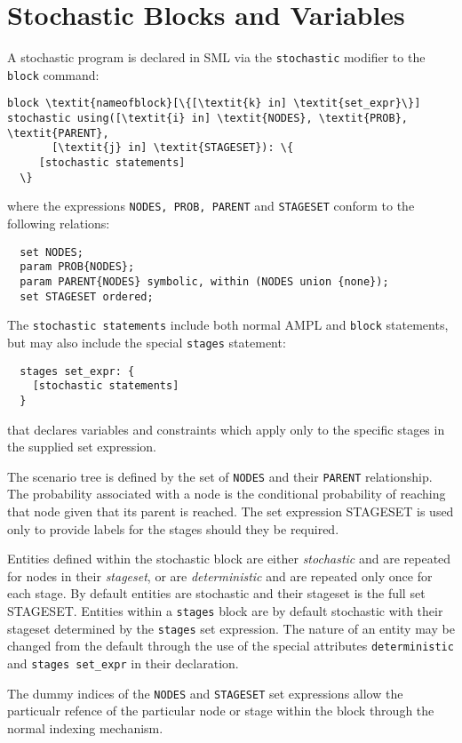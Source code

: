 \documentclass[10pt,a4paper]{report}
\begin{document}
\section{Stochastic Blocks and Variables}
A stochastic program is declared in SML via the {\tt stochastic} modifier
to the {\tt block} command:
\begin{Verbatim}[commandchars=\\\{\}]
  block \textit{nameofblock}[\{[\textit{k} in] \textit{set_expr}\}] stochastic using([\textit{i} in] \textit{NODES}, \textit{PROB}, \textit{PARENT}, 
       [\textit{j} in] \textit{STAGESET}): \{
     [stochastic statements]
  \}
\end{Verbatim}
where the expressions {\tt NODES, PROB, PARENT} and {\tt STAGESET} conform to
the following relations:
\begin{verbatim}
  set NODES; 
  param PROB{NODES};
  param PARENT{NODES} symbolic, within (NODES union {none});
  set STAGESET ordered;  
\end{verbatim}
The {\tt stochastic statements} include both normal AMPL and {\tt block}
statements, but may also include the special {\tt stages} statement:
\begin{verbatim}
  stages set_expr: {
    [stochastic statements]
  }
\end{verbatim}
that declares variables and constraints which apply only to the specific stages
in the supplied set expression.

The scenario tree is defined by the set of {\tt NODES} and their {\tt PARENT}
relationship. The probability associated with a node is the conditional
probability of reaching that node given that its parent is reached. The
set expression STAGESET is used only to provide labels for the stages should
they be required.

Entities defined within the stochastic block are either {\it stochastic} and
are repeated for nodes in their {\it stageset}, or are {\it deterministic} and
are repeated only once for each stage. By default entities are stochastic
and their stageset is the full set STAGESET. Entities within a {\tt stages}
block are by default stochastic with their stageset determined by the
{\tt stages} set expression.
The nature of an entity may be changed from the default through the use of the
special attributes {\tt deterministic} and {\tt stages set\_expr} in their
declaration.

The dummy indices of the {\tt NODES} and {\tt STAGESET} set expressions allow
the particualr refence of the particular node or stage within the block through
the normal indexing mechanism.
\end{document}
